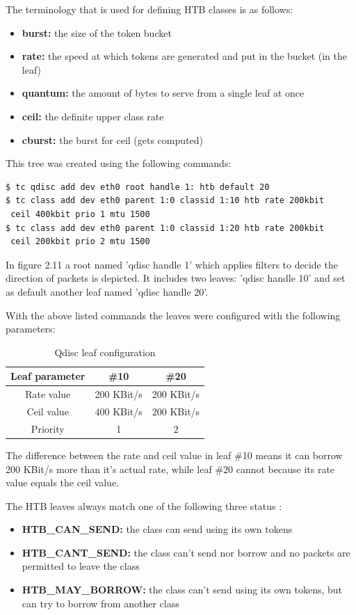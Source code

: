 The terminology that is used for defining HTB classes is as follows:
\begin{itemize}
\item \textbf{burst:} the size of the token bucket
\item \textbf{rate:} the speed at which tokens are generated and put in the bucket (in the leaf)
\item \textbf{quantum:} the amount of bytes to serve from a single leaf at once
\item \textbf{ceil:} the definite upper class rate
\item \textbf{cburst:} the burst for ceil (gets computed)
\end{itemize}

This tree was created using the following commands:
\begin{lstlisting}
$ tc qdisc add dev eth0 root handle 1: htb default 20
$ tc class add dev eth0 parent 1:0 classid 1:10 htb rate 200kbit
 ceil 400kbit prio 1 mtu 1500
$ tc class add dev eth0 parent 1:0 classid 1:20 htb rate 200kbit
 ceil 200kbit prio 2 mtu 1500
\end{lstlisting}

In figure 2.11 a root named 'qdisc handle 1' which applies filters to decide the direction of packets is depicted. It includes two leaves: 'qdisc handle 10' and set as default another leaf named 'qdisc handle 20'.

With the above listed commands the leaves were configured with the following parameters:

\begin{table}[H]
\centering

\begin{tabular}{|c|c|c|}
\hline Leaf parameter & \#10 & \#20 \\ 
\hline Rate value & 200 KBit/s & 200 KBit/s \\ 
\hline Ceil value & 400 KBit/s & 200 KBit/s \\ 
\hline Priority & 1 & 2 \\ 
\hline 
\end{tabular} 

\caption{Qdisc leaf configuration}
\end{table}

The difference between the rate and ceil value in leaf \#10 means it can borrow 200 KBit/s more than it's actual rate, while leaf \#20 cannot because its rate value equals the ceil value.

The HTB leaves always match one of the following three status \cite{htb-qdiscs}:
\begin{itemize}
\item \textbf{HTB\_CAN\_SEND:} the class can send using its own tokens
\item \textbf{HTB\_CANT\_SEND:} the class can't send nor borrow and no packets are permitted to leave the class
\item \textbf{HTB\_MAY\_BORROW:} the class can't send using its own tokens, but can try to borrow from another class
\end{itemize}

